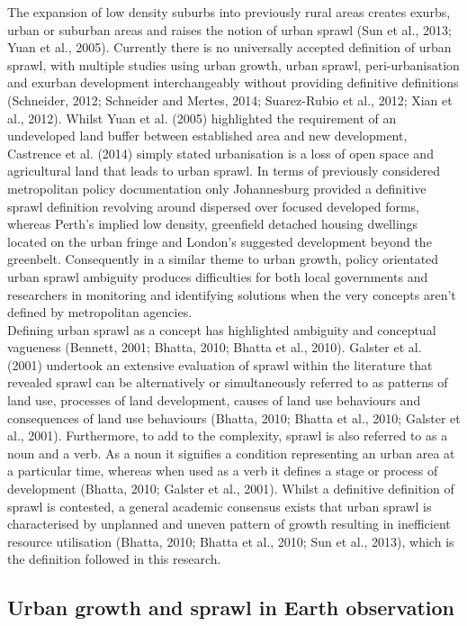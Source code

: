 \documentclass[]{book}
\begin{document}
The expansion of low density suburbs into previously rural areas creates
exurbs, urban or suburban areas and raises the notion of urban sprawl
(Sun et al., 2013; Yuan et al., 2005). Currently there is no universally
accepted definition of urban sprawl, with multiple studies using urban
growth, urban sprawl, peri-urbanisation and exurban development
interchangeably without providing definitive definitions (Schneider,
2012; Schneider and Mertes, 2014; Suarez-Rubio et al., 2012; Xian et
al., 2012). Whilst Yuan et al. (2005) highlighted the requirement of an
undeveloped land buffer between established area and new development,
Castrence et al. (2014) simply stated urbanisation is a loss of open
space and agricultural land that leads to urban sprawl. In terms of
previously considered metropolitan policy documentation only
Johannesburg provided a definitive sprawl definition revolving around
dispersed over focused developed forms, whereas Perth's implied low
density, greenfield detached housing dwellings located on the urban
fringe and London's suggested development beyond the greenbelt.
Consequently in a similar theme to urban growth, policy orientated urban
sprawl ambiguity produces difficulties for both local governments and
researchers in monitoring and identifying solutions when the very
concepts aren't defined by metropolitan agencies.\\
Defining urban sprawl as a concept has highlighted ambiguity and
conceptual vagueness (Bennett, 2001; Bhatta, 2010; Bhatta et al., 2010).
Galster et al. (2001) undertook an extensive evaluation of sprawl within
the literature that revealed sprawl can be alternatively or
simultaneously referred to as patterns of land use, processes of land
development, causes of land use behaviours and consequences of land use
behaviours (Bhatta, 2010; Bhatta et al., 2010; Galster et al., 2001).
Furthermore, to add to the complexity, sprawl is also referred to as a
noun and a verb. As a noun it signifies a condition representing an
urban area at a particular time, whereas when used as a verb it defines
a stage or process of development (Bhatta, 2010; Galster et al., 2001).
Whilst a definitive definition of sprawl is contested, a general
academic consensus exists that urban sprawl is characterised by
unplanned and uneven pattern of growth resulting in inefficient resource
utilisation (Bhatta, 2010; Bhatta et al., 2010; Sun et al., 2013), which
is the definition followed in this research.

\subsection{Urban growth and sprawl in Earth
observation}\label{urban-growth-and-sprawl-in-earth-observation}
\end{document}
